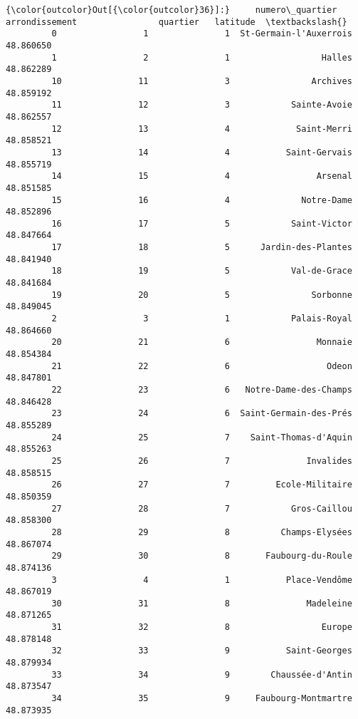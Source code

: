 \documentclass[11pt]{article}
\begin{document}
\begin{Verbatim}[commandchars=\\\{\}]
{\color{outcolor}Out[{\color{outcolor}36}]:}     numero\_quartier  arrondissement                quartier   latitude  \textbackslash{}
         0                 1               1  St-Germain-l'Auxerrois  48.860650   
         1                 2               1                  Halles  48.862289   
         10               11               3                Archives  48.859192   
         11               12               3            Sainte-Avoie  48.862557   
         12               13               4             Saint-Merri  48.858521   
         13               14               4           Saint-Gervais  48.855719   
         14               15               4                 Arsenal  48.851585   
         15               16               4              Notre-Dame  48.852896   
         16               17               5            Saint-Victor  48.847664   
         17               18               5      Jardin-des-Plantes  48.841940   
         18               19               5            Val-de-Grace  48.841684   
         19               20               5                Sorbonne  48.849045   
         2                 3               1            Palais-Royal  48.864660   
         20               21               6                 Monnaie  48.854384   
         21               22               6                   Odeon  48.847801   
         22               23               6   Notre-Dame-des-Champs  48.846428   
         23               24               6  Saint-Germain-des-Prés  48.855289   
         24               25               7    Saint-Thomas-d'Aquin  48.855263   
         25               26               7               Invalides  48.858515   
         26               27               7         Ecole-Militaire  48.850359   
         27               28               7            Gros-Caillou  48.858300   
         28               29               8          Champs-Elysées  48.867074   
         29               30               8       Faubourg-du-Roule  48.874136   
         3                 4               1           Place-Vendôme  48.867019   
         30               31               8               Madeleine  48.871265   
         31               32               8                  Europe  48.878148   
         32               33               9           Saint-Georges  48.879934   
         33               34               9        Chaussée-d'Antin  48.873547   
         34               35               9     Faubourg-Montmartre  48.873935   

\end{Verbatim}
\end{document}
